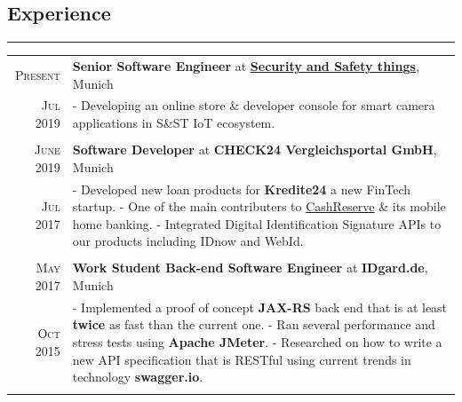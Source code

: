 \documentclass[a4paper,13pt]{article}
\begin{document}
\begin{adjustwidth}{-3cm}{}

\section{Experience}
\rule[0pt]{20cm}{0.5pt}

\begin{tabular}{r|p{17.5cm}}
	
						\textsc{Present} & \textbf{Senior Software Engineer} at \textbf{\href{https://www.securityandsafetythings.com}{Security and Safety things}}, Munich \\
		\textsc{Jul 2019}  &	
		\footnotesize {
							- Developing an online store \& developer console for smart camera applications in S\&ST IoT ecosystem.
						}
		\\ \multicolumn{2}{c}{}\\
				\textsc{June 2019} & \textbf{Software Developer} at \textbf{CHECK24 Vergleichsportal GmbH}, Munich \\
		\textsc{Jul 2017} & \footnotesize{
				- Developed new loan products for \textbf{Kredite24} a new FinTech startup.\newline
			- One of the main contributers to \href{https://www.check24.de/cashreserve/}{CashReserve} \& its mobile home banking. \newline
- Integrated Digital Identification Signature APIs to our products including IDnow and WebId.
	}
		\\ \multicolumn{2}{c}{}\\
		
\textsc{May 2017} & \textbf{Work Student Back-end Software Engineer} at \textbf{IDgard.de}, Munich \\
\textsc{Oct 2015} & \footnotesize{
	- Implemented a proof of concept \textbf{JAX-RS} back end that is at least \textbf{twice} as fast than the current one.\newline
	- Ran several performance and stress tests using \textbf{Apache JMeter}. \newline
	- Researched on how to write a new API specification that is RESTful using current trends in technology \textbf{swagger.io}.
}
\\ \multicolumn{2}{c}{}\\



\end{tabular}
\end{adjustwidth}
\end{document}
